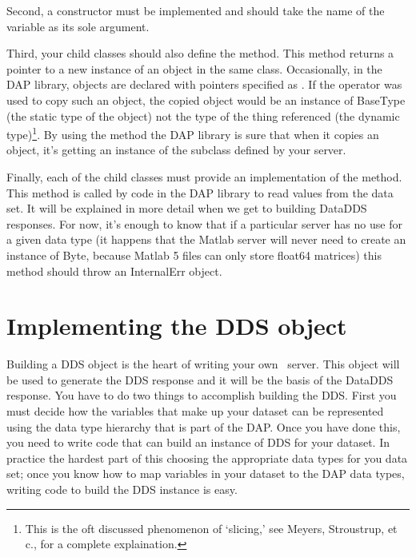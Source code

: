 \documentclass{dods-paper}
\begin{document}
Second, a constructor must be implemented and should take the name of the
variable as its sole argument.

Third, your child classes should also define the 
method. This method returns a pointer to a new instance of an object in the
same class. Occasionally, in the DAP library, objects are declared with
pointers specified as . If the  operator was used to
copy such an object, the copied object would be an instance of BaseType (the
static type of the object) not the type of the thing referenced (the dynamic
type)\footnote{This is the oft discussed phenomenon of `slicing,' see
Meyers\cite{meyers:ecpp}, Stroustrup\cite{stroustrup:cpp}, et c., for a
complete explaination.}. By using the  method the DAP
library is sure that when it copies an object, it's getting an instance of
the subclass defined by your server.

Finally, each of the child classes must provide an implementation of the
 method. This method is called by code in the DAP library to read
values from the data set. It will be explained in more detail when we get to
building DataDDS responses. For now, it's enough to know that if a particular
server has no use for a given data type (it happens that the Matlab server
will never need to create an instance of Byte, because Matlab 5 files can
only store float64 matrices) this method should throw an InternalErr object.

\section{Implementing the DDS object}
\label{server-tut,implementing}

Building a DDS object is the heart of writing your own \opendap\ server. This
object will be used to generate the DDS response and it will be the basis of
the DataDDS response. You have to do two things to accomplish building the
DDS. First you must decide how the variables that make up your dataset can be
represented using the data type hierarchy that is part of the DAP. Once you
have done this, you need to write code that can build an instance of DDS for
your dataset. In practice the hardest part of this choosing the appropriate
data types for you data set; once you know how to map variables in your
dataset to the DAP data types, writing code to build the DDS instance is
easy.
\end{document}

